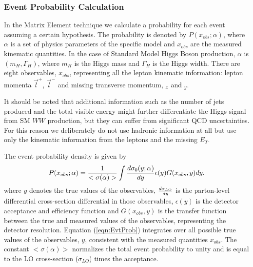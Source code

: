 \subsubsection{Event Probability Calculation}

In the Matrix Element technique we calculate a probability  for each event assuming a
certain hypothesis.  The probability is denoted by $P(x_{obs};\alpha)$,
where $\alpha$ is a set of physics 
parameters of the specific model and $x_{obs}$ are the measured kinematic quantities.
In the case of Standard Model Higgs Boson production,
 $\alpha$ is $(m_H, \Gamma_H)$, where  $m_H$ is the Higgs mass 
and $\Gamma_H$ is the Higgs width. There are eight observables, $x_{obs}$, representing all the 
lepton kinematic information: lepton momenta $\vec{l}^+$, $\vec{l}^-$ and missing 
transverse momentum, \met$_x$ and \met$_y$.

It should be noted that additional information such as the number of jets
produced and the total visible energy might further differentiate the Higgs signal from SM
$WW$ production,
but they can suffer from significant  QCD uncertainties. For this reason we 
deliberately do not use hadronic information at all but use
only the kinematic information from the leptons and the missing $E_T$.

The event probability density is given by
\begin{equation}
P(x_{obs};\alpha) =
 {1 \over < \sigma(\alpha) > }
 \int \frac {d \sigma_{0} (y;\alpha) }{ dy }
 \epsilon (y) G(x_{obs},y) dy,  
\label{eqn:EvtProb}  
\end{equation}
where $y$ denotes the true values of the observables,
$d \sigma_{LO} \over  dy$ is the  parton-level differential cross-section differential
in those observables, $\epsilon(y)$ is the detector acceptance and efficiency function
and $G(x_{obs},y)$ is the transfer function between the true and measured values of the
observables, representing the detector resolution.
Equation (\ref{eqn:EvtProb}) integrates over all possible true values of the
observables, $y$, consistent with the measured quantities $x_{obs}$.
The constant $<\sigma(\alpha)>$ normalizes the total event probability to unity
and is equal to the LO cross-section ($\sigma_{LO}$) times the acceptance.

